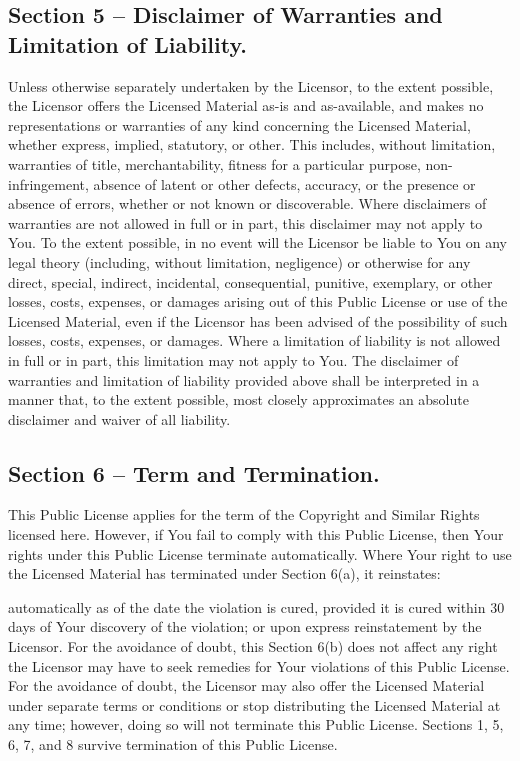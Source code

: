 \subsection{Section 5 – Disclaimer of Warranties and Limitation of Liability.}

Unless otherwise separately undertaken by the Licensor, to the extent possible, the Licensor offers the Licensed Material as-is and as-available, and makes no representations or warranties of any kind concerning the Licensed Material, whether express, implied, statutory, or other. This includes, without limitation, warranties of title, merchantability, fitness for a particular purpose, non-infringement, absence of latent or other defects, accuracy, or the presence or absence of errors, whether or not known or discoverable. Where disclaimers of warranties are not allowed in full or in part, this disclaimer may not apply to You.
To the extent possible, in no event will the Licensor be liable to You on any legal theory (including, without limitation, negligence) or otherwise for any direct, special, indirect, incidental, consequential, punitive, exemplary, or other losses, costs, expenses, or damages arising out of this Public License or use of the Licensed Material, even if the Licensor has been advised of the possibility of such losses, costs, expenses, or damages. Where a limitation of liability is not allowed in full or in part, this limitation may not apply to You.
The disclaimer of warranties and limitation of liability provided above shall be interpreted in a manner that, to the extent possible, most closely approximates an absolute disclaimer and waiver of all liability.

\subsection{Section 6 – Term and Termination.}

This Public License applies for the term of the Copyright and Similar Rights licensed here. However, if You fail to comply with this Public License, then Your rights under this Public License terminate automatically.
Where Your right to use the Licensed Material has terminated under Section 6(a), it reinstates:

automatically as of the date the violation is cured, provided it is cured within 30 days of Your discovery of the violation; or
upon express reinstatement by the Licensor.
For the avoidance of doubt, this Section 6(b) does not affect any right the Licensor may have to seek remedies for Your violations of this Public License.
For the avoidance of doubt, the Licensor may also offer the Licensed Material under separate terms or conditions or stop distributing the Licensed Material at any time; however, doing so will not terminate this Public License.
Sections 1, 5, 6, 7, and 8 survive termination of this Public License.

